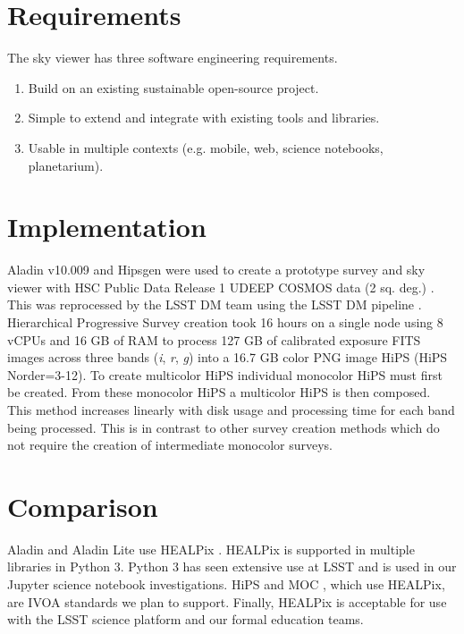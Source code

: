 \documentclass[11pt,twoside]{article}
\begin{document}

\section{Requirements}
The sky viewer has three software engineering requirements.
\begin{enumerate}
\item Build on an existing sustainable open-source project.
\item Simple to extend and integrate with existing tools and libraries.
\item Usable in multiple contexts (e.g. mobile, web, science notebooks, planetarium).
\end{enumerate}

\section{Implementation}
Aladin v10.009 and Hipsgen were used to create a prototype survey and sky viewer with HSC Public Data Release 1 UDEEP COSMOS data (2 sq. deg.) \citep{2017arXiv170208449A}. This was reprocessed by the LSST DM team using the LSST DM pipeline \citep{2015arXiv151207914J}. Hierarchical Progressive Survey \citep[HiPS,][]{2015A&A...578A.114F} creation took 16 hours on a single node using 8 vCPUs and 16 GB of RAM to process 127 GB of calibrated exposure FITS images across three bands (\emph{i}, \emph{r}, \emph{g}) into a 16.7 GB color PNG image HiPS (HiPS Norder=3-12). To create multicolor HiPS individual monocolor HiPS must first be created. From these monocolor HiPS a multicolor HiPS is then composed. This method increases linearly with disk usage and processing time for each band being processed. This is in contrast to other survey creation methods which do not require the creation of intermediate monocolor surveys.
\section{Comparison}
Aladin and Aladin Lite use HEALPix \citep{2007MNRAS.381..865C}. HEALPix is supported in multiple libraries in Python 3. Python 3 has seen extensive use at LSST \citep{P1-123_adassxxvii} and is used in our Jupyter \citep{PER-GRA:2007} science notebook investigations. HiPS and MOC \citep{2015A&A...578A.114F}, which use HEALPix, are IVOA standards we plan to support. Finally, HEALPix is acceptable for use with the LSST science platform \citep{2017LSST.1.LDM-542} and our formal education teams.
\end{document}
